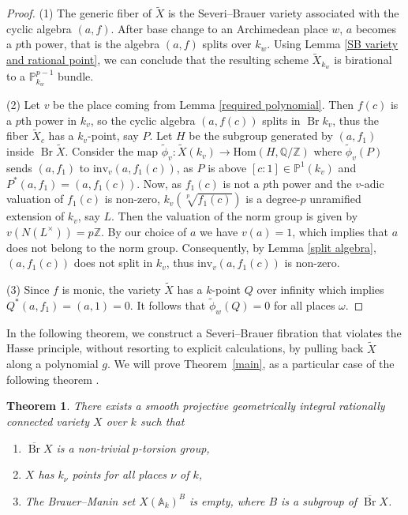 \documentclass[11pt]{amsart}
\theoremstyle{plain}
\newtheorem{theorem}[thm]{Theorem}
\theoremstyle{definition}
\renewcommand{\P}{{\mathbb P}}
\DeclareMathOperator{\Br}{Br}
\begin{document}
	
	\begin{proof}
		(1) The generic fiber of $\tilde{X}$ is the Severi--Brauer variety associated with the cyclic algebra $(a, f)$. After base change to an Archimedean place $w$, $a$ becomes a $p$th power, that is the algebra $(a, f)$ splits over $k_w$. Using Lemma \ref{SB variety and rational point}, we can conclude that the resulting scheme $\tilde{X}_{k_w}$ is birational to a $\mathbb{P}^{p-1}_{k_w}$ bundle. 
		
		(2) Let $v$ be the place coming from Lemma \ref{required polynomial}. Then $f(c)$ is a $p$th power in $k_v$, so the cyclic algebra \((a, f(c)) \) splits in \(\Br k_{v}\), thus the fiber \(\tilde{X}_c\) has a \(k_{v}\)-point, say \(P\). Let \( H\) be the subgroup generated by \((a,f_1)\) inside \(\Br\tilde{X} \). Consider the map $\tilde{\phi}_{v} : \tilde{X}(k_{v}) \to \mathrm{Hom}(H, \mathbb{Q}/\mathbb{Z})$ where \(\tilde{\phi}_{v}(P)\)  sends \((a, f_1)\) to \(\mathrm{inv}_{v}(a, f_1(c))\), as $P$ is above $[c:1]\in \P^1(k_v)$ and $P^{*}(a,f_1)=(a,f_1(c))$. Now, as $f_1(c)$ is not a $p$th power and the \(v\)-adic valuation of \(f_1(c)\) is non-zero, \( k_v(\sqrt[p]{f_1(c)}) \) is a degree-\(p\) unramified extension of \( k_v \), say $L$. Then the valuation of the norm group is given by \( v(N(L^{\times})) = p\mathbb{Z} \). By our choice of \( a \) we have \( v(a) = 1 \), which implies that \( a \) does not belong to the norm group. Consequently, by Lemma \ref{split algebra}, \( (a, f_1(c)) \) does not split in $k_{v}$, thus \(\mathrm{inv}_v(a, f_1(c))\) is non-zero.

		
		(3) Since \( f \) is monic, the variety \( \tilde{X} \) has a \( k \)-point \( Q \) over infinity which implies \( Q^*(a, f_1) = (a, 1) = 0 \). It follows that \( \tilde{\phi}_w(Q) = 0 \) for all places $\omega$.
	\end{proof}

    
    In the following theorem, we construct a Severi--Brauer fibration that
    violates the Hasse principle, without resorting to explicit calculations,
    by pulling back \(\tilde{X}\) along a polynomial \(g\). We will prove Theorem~\ref{main}, as a particular case of the following theorem	.
    
	\begin{theorem} \label{SB fibration violating Hasse}
		There exists a smooth projective geometrically integral rationally connected variety $X$ over $k$ such that
		\begin{enumerate}[label=\arabic*.]
			\item  \( \overline{\Br}X \) is a non-trivial $p$-torsion group,
			\item $X$ has $k_{\nu}$ points for all places $\nu$ of $k$,
			\item The Brauer--Manin set \( X(\mathbb{A}_k)^B \) is empty, where \( B \) is a subgroup of \( \overline{\Br}X \).
		\end{enumerate}
	\end{theorem}
	
\end{document}
